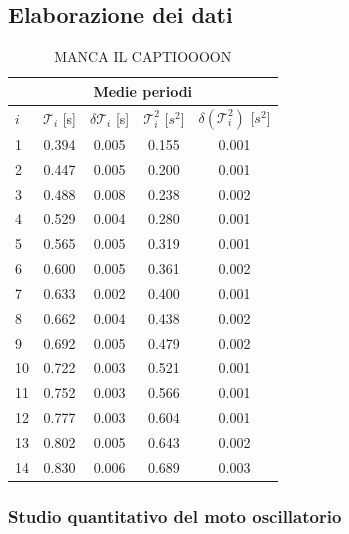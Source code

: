 \subsection{Elaborazione dei dati}

\begin{table}
    \centering
	\begin{tabular}{l c  c  c  c }
        \multicolumn{5}{c}{\textbf{Medie periodi}} \\
        \toprule
        $i$ & $\mathcal{T}_i$ [s] & $\delta\mathcal{T}_i$ [s] & $\mathcal{T}_i^2$ [$s^2$] & $\delta(\mathcal{T}_i^2)$ [$s^2$] \\

        \midrule

        1 & 0.394		& 0.005		& 0.155		& 0.001	\\
        2 & 0.447		& 0.005		& 0.200		& 0.001	\\
        3 & 0.488		& 0.008		& 0.238		& 0.002	\\
        4 & 0.529		& 0.004		& 0.280		& 0.001	\\
        5 & 0.565		& 0.005		& 0.319		& 0.001	\\
        6 & 0.600		& 0.005		& 0.361		& 0.002	\\
        7 & 0.633		& 0.002		& 0.400		& 0.001	\\
        8 & 0.662		& 0.004		& 0.438		& 0.002	\\
        9 & 0.692		& 0.005		& 0.479		& 0.002	\\
        10 & 0.722		& 0.003		& 0.521		& 0.001	\\
        11 & 0.752		& 0.003		& 0.566		& 0.001	\\
        12 & 0.777		& 0.003		& 0.604		& 0.001	\\
        13 & 0.802		& 0.005		& 0.643		& 0.002	\\
        14 & 0.830		& 0.006		& 0.689		& 0.003	\\

        \bottomrule

	\end{tabular}
    \caption{MANCA IL CAPTIOOOON}
    \label{tab:calcolati}
\end{table}

\subsubsection{Studio quantitativo del moto oscillatorio}

